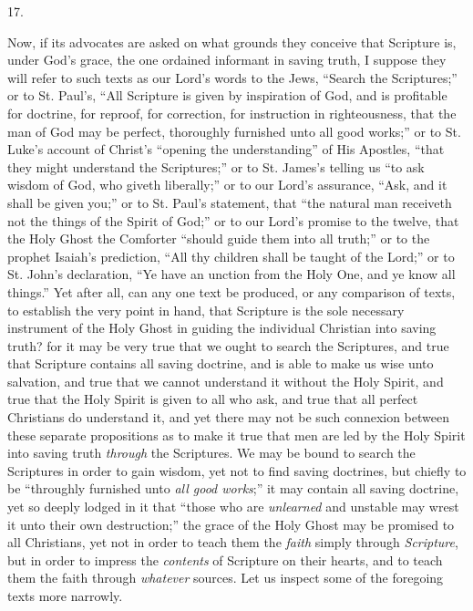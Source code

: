 17.

Now, if its advocates are asked on what grounds they conceive that
Scripture is, under God's grace, the one ordained informant in saving
truth, I suppose they will refer to such texts as our Lord's words to
the Jews, ``Search the Scriptures;'' or to St. Paul's,
``All Scripture is given by inspiration of God, and is profitable
for doctrine, for reproof, for correction, for instruction in
righteousness, that the man of God may be perfect, thoroughly furnished
unto all good works;'' or to St. Luke's account of Christ's
``opening the understanding'' of His Apostles, ``that they
might understand the Scriptures;'' or to St. James's telling us
``to ask wisdom of God, who giveth liberally;'' or to our Lord's
assurance, ``Ask, and it shall be given you;'' or to St. Paul's
statement, that ``the natural man receiveth not the things of the
Spirit of God;'' or to our Lord's promise to the twelve, that the
Holy Ghost the Comforter ``should guide them into all truth;''
or to the prophet Isaiah's prediction, ``All thy children shall be
taught of the Lord;'' or to St. John's declaration, ``Ye have
an unction from the Holy One, and ye know all things.'' Yet after
all, can any one text be produced, or any comparison of texts, to
establish the very point in hand, that Scripture is the sole
necessary instrument of the Holy Ghost in guiding the individual
Christian into saving truth? for it may be very true that we ought to
search the Scriptures, and true that Scripture contains all saving
doctrine, and is able to make us wise unto salvation, and true that we
cannot understand it without the Holy Spirit, and true that the Holy
Spirit is given to all who ask, and true that all perfect Christians
do understand it, and yet there may not be such connexion between
these separate propositions as to make it true that men are led by the
Holy Spirit into saving truth \emph{through} the Scriptures. We may be
bound to search the Scriptures in order to gain wisdom, yet not to
find saving doctrines, but chiefly to be ``throughly furnished
unto \emph{all good works};'' it may contain all saving doctrine,
yet so deeply lodged in it that ``those who are \emph{unlearned}
and unstable may wrest it unto their own destruction;'' the grace
of the Holy Ghost may be promised to all Christians, yet not in order
to teach them the \emph{faith} simply through \emph{Scripture}, but in
order to impress the \emph{contents} of Scripture on their hearts, and
to teach them the faith through \emph{whatever} sources. Let us
inspect some of the foregoing texts more narrowly.

